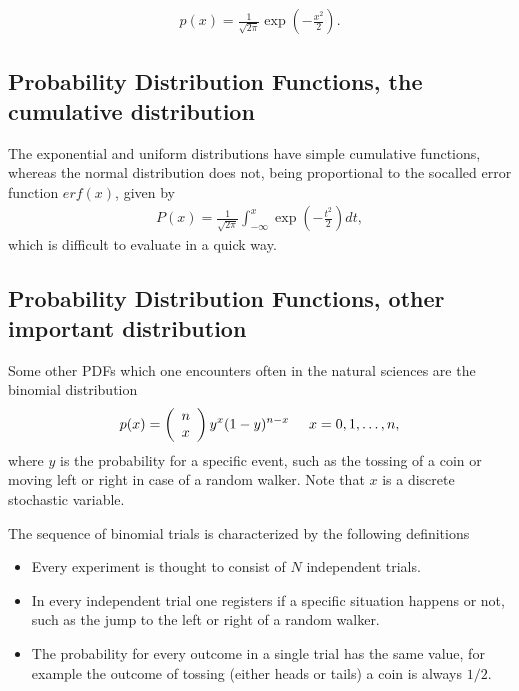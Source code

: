 \documentclass[letterpaper,10pt,english]{sphinxmanual}
\begin{document}
\begin{equation*}
\begin{split}
\begin{equation}
   p(x)=\frac{1}{\sqrt{2\pi}}\exp{\left(-\frac{x^2}{2}\right)}.
\label{_auto1} \tag{3}
\end{equation}
\end{split}
\end{equation*}

\subsection{Probability Distribution Functions, the cumulative distribution}
\label{\detokenize{chapter2:probability-distribution-functions-the-cumulative-distribution}}
The exponential and uniform distributions have simple cumulative functions,
whereas the normal distribution does not, being proportional to the so\sphinxhyphen{}called
error function \(erf(x)\), given by
\begin{equation*}
\begin{split}
P(x) = \frac{1}{\sqrt{2\pi}}\int_{-\infty}^x\exp{\left(-\frac{t^2}{2}\right)}dt,
\end{split}
\end{equation*}
which is difficult to evaluate in a quick way.


\subsection{Probability Distribution Functions, other important distribution}
\label{\detokenize{chapter2:probability-distribution-functions-other-important-distribution}}
Some other PDFs which one encounters often in the natural sciences are the binomial distribution
\begin{equation*}
\begin{split}
p(x) = \left(\begin{array}{c} n \\ x\end{array}\right)y^x(1-y)^{n-x} \hspace{0.5cm}x=0,1,\dots,n,
\end{split}
\end{equation*}
where \(y\) is the probability for a specific event, such as the tossing of a coin or moving left or right
in case of a random walker. Note that \(x\) is a discrete stochastic variable.

The sequence of binomial trials is characterized by the following definitions
\begin{itemize}
\item {} 
Every experiment is thought to consist of \(N\) independent trials.

\item {} 
In every independent trial one registers if a specific situation happens or not, such as the  jump to the left or right of a random walker.

\item {} 
The probability for every outcome in a single trial has the same value, for example the outcome of tossing (either heads or tails) a coin is always \(1/2\).

\end{itemize}
\end{document}
